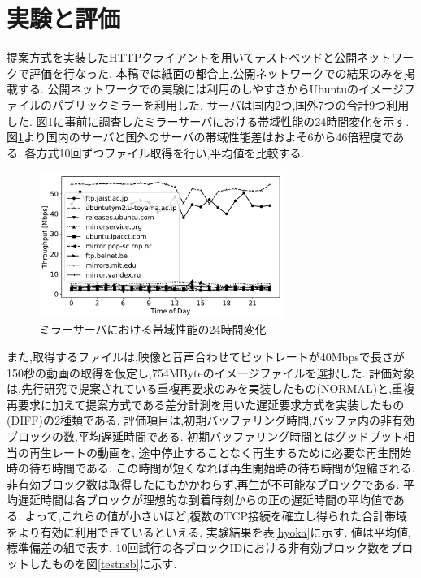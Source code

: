 \documentclass{ltjsarticle}
\begin{document}
\section{実験と評価}
\vspace{-3mm}
提案方式を実装したHTTPクライアントを用いてテストベッドと公開ネットワークで評価を行なった.
本稿では紙面の都合上,公開ネットワークでの結果のみを掲載する.
公開ネットワークでの実験には利用のしやすさからUbuntuのイメージファイルのパブリックミラーを利用した.
サーバは国内2つ,国外7つの合計9つ利用した.
図\ref{mirror}に事前に調査したミラーサーバにおける帯域性能の24時間変化を示す.
図\ref{mirror}より国内のサーバと国外のサーバの帯域性能差はおよそ6から46倍程度である.
各方式10回ずつファイル取得を行い,平均値を比較する.
\vspace{0mm}
\begin{figure}[h]
	\centering
	\includegraphics[width=8cm]{figure/thp24h-g.pdf}
	\vspace{-4.25mm}
	\caption{ミラーサーバにおける帯域性能の24時間変化}
	\vspace{-6.5mm}
	\label{mirror}
\end{figure}
また,取得するファイルは,映像と音声合わせてビットレートが40Mbpsで長さが150秒の動画の取得を仮定し,754MByteのイメージファイルを選択した.
評価対象は,先行研究で提案されている重複再要求のみを実装したもの(NORMAL)と,重複再要求に加えて提案方式である差分計測を用いた遅延要求方式を実装したもの(DIFF)の2種類である.
評価項目は,初期バッファリング時間,バッファ内の非有効ブロックの数,平均遅延時間である.
初期バッファリング時間とはグッドプット相当の再生レートの動画を,
途中停止することなく再生するために必要な再生開始時の待ち時間である.
この時間が短くなれば再生開始時の待ち時間が短縮される.
非有効ブロック数は取得したにもかかわらず,再生が不可能なブロックである.
平均遅延時間は各ブロックが理想的な到着時刻からの正の遅延時間の平均値である.
よって,これらの値が小さいほど,複数のTCP接続を確立し得られた合計帯域をより有効に利用できているといえる.
実験結果を表\ref{hyoka}に示す.
値は平均値,標準偏差の組で表す.
10回試行の各ブロックIDにおける非有効ブロック数をプロットしたものを図\ref{testnsb}に示す.
\end{document}

